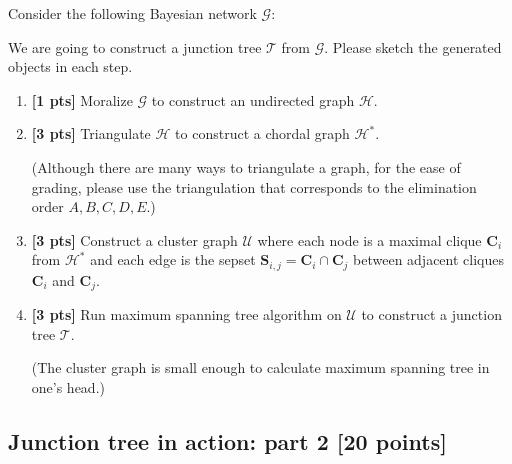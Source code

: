 \documentclass[12pt]{article}
\newcommand{\Gcal}{\mathcal{G}}
\newcommand{\Hcal}{\mathcal{H}}
\newcommand{\Ucal}{\mathcal{U}}
\newcommand{\Tcal}{\mathcal{T}}
\newcommand{\Cbs}{\boldsymbol{C}}
\newcommand{\Sbs}{\boldsymbol{S}}
\begin{document}
Consider the following Bayesian network $ \Gcal $:
\begin{figure}[h]
\centering
{}
\end{figure}

We are going to construct a junction tree $ \Tcal $ from $ \Gcal $.
Please sketch the generated objects in each step.

\begin{enumerate}
\item \textbf{[1 pts]} Moralize $ \Gcal $ to construct an undirected graph $ \Hcal $.



\item \textbf{[3 pts]} Triangulate $ \Hcal $ to construct a chordal graph $ \Hcal^* $. 

(Although there are many ways to triangulate a graph, for the ease of grading, please use the triangulation that corresponds to the elimination order $ A, B, C, D, E $.)


\item \textbf{[3 pts]} Construct a cluster graph $ \Ucal $ where each node is a maximal clique $ \Cbs_i $ from $ \Hcal^* $ and each edge is the sepset $ \Sbs_{i,j} = \Cbs_i \cap \Cbs_j $ between adjacent cliques $ \Cbs_i $ and $ \Cbs_j $. 




\item \textbf{[3 pts]} Run maximum spanning tree algorithm on $ \Ucal $ to construct a junction tree $ \Tcal $. 

(The cluster graph is small enough to calculate maximum spanning tree in one's head.)


\end{enumerate}



\subsection{Junction tree in action: part 2 [20 points]}
\end{document}
